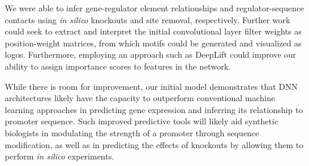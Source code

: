 \documentclass{article}
\begin{document}
We were able to infer gene-regulator element relationships and regulator-sequence contacts using \textit{in silico} knockouts and site removal, respectively. Further work could seek to extract and interpret the initial convolutional layer filter weights as position-weight matrices, from which motifs could be generated and visualized as logos. Furthermore, employing an approach such as DeepLift \cite{Shrikumar:2016uya} could improve our ability to assign importance scores to features in the network.

While there is room for improvement, our initial model demonstrates that DNN architectures likely have the capacity to outperform conventional machine learning approaches in predicting gene expression and inferring its relationship to promoter sequence. Such improved predictive tools will likely aid synthetic biologists in modulating the strength of a promoter through sequence modification, as well as in predicting the effects of knockouts by allowing them to perform \textit{in silico} experiments.



\end{document}
